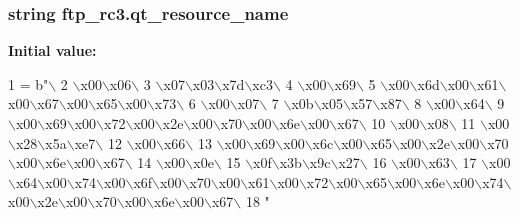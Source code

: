 \subsubsection[{qt\+\_\+resource\+\_\+name}]{\setlength{\rightskip}{0pt plus 5cm}string ftp\+\_\+rc3.\+qt\+\_\+resource\+\_\+name}\label{namespaceftp__rc3_a591b09e24ae2f06c90b5482ab500c860}
{\bfseries Initial value\+:}
\begin{DoxyCode}
1 = b\textcolor{stringliteral}{"\(\backslash\)}
2 \textcolor{stringliteral}{\(\backslash\)x00\(\backslash\)x06\(\backslash\)}
3 \textcolor{stringliteral}{\(\backslash\)x07\(\backslash\)x03\(\backslash\)x7d\(\backslash\)xc3\(\backslash\)}
4 \textcolor{stringliteral}{\(\backslash\)x00\(\backslash\)x69\(\backslash\)}
5 \textcolor{stringliteral}{\(\backslash\)x00\(\backslash\)x6d\(\backslash\)x00\(\backslash\)x61\(\backslash\)x00\(\backslash\)x67\(\backslash\)x00\(\backslash\)x65\(\backslash\)x00\(\backslash\)x73\(\backslash\)}
6 \textcolor{stringliteral}{\(\backslash\)x00\(\backslash\)x07\(\backslash\)}
7 \textcolor{stringliteral}{\(\backslash\)x0b\(\backslash\)x05\(\backslash\)x57\(\backslash\)x87\(\backslash\)}
8 \textcolor{stringliteral}{\(\backslash\)x00\(\backslash\)x64\(\backslash\)}
9 \textcolor{stringliteral}{\(\backslash\)x00\(\backslash\)x69\(\backslash\)x00\(\backslash\)x72\(\backslash\)x00\(\backslash\)x2e\(\backslash\)x00\(\backslash\)x70\(\backslash\)x00\(\backslash\)x6e\(\backslash\)x00\(\backslash\)x67\(\backslash\)}
10 \textcolor{stringliteral}{\(\backslash\)x00\(\backslash\)x08\(\backslash\)}
11 \textcolor{stringliteral}{\(\backslash\)x00\(\backslash\)x28\(\backslash\)x5a\(\backslash\)xe7\(\backslash\)}
12 \textcolor{stringliteral}{\(\backslash\)x00\(\backslash\)x66\(\backslash\)}
13 \textcolor{stringliteral}{\(\backslash\)x00\(\backslash\)x69\(\backslash\)x00\(\backslash\)x6c\(\backslash\)x00\(\backslash\)x65\(\backslash\)x00\(\backslash\)x2e\(\backslash\)x00\(\backslash\)x70\(\backslash\)x00\(\backslash\)x6e\(\backslash\)x00\(\backslash\)x67\(\backslash\)}
14 \textcolor{stringliteral}{\(\backslash\)x00\(\backslash\)x0e\(\backslash\)}
15 \textcolor{stringliteral}{\(\backslash\)x0f\(\backslash\)x3b\(\backslash\)x9c\(\backslash\)x27\(\backslash\)}
16 \textcolor{stringliteral}{\(\backslash\)x00\(\backslash\)x63\(\backslash\)}
17 \textcolor{stringliteral}{\(\backslash\)x00\(\backslash\)x64\(\backslash\)x00\(\backslash\)x74\(\backslash\)x00\(\backslash\)x6f\(\backslash\)x00\(\backslash\)x70\(\backslash\)x00\(\backslash\)x61\(\backslash\)x00\(\backslash\)x72\(\backslash\)x00\(\backslash\)x65\(\backslash\)x00\(\backslash\)x6e\(\backslash\)x00\(\backslash\)x74\(\backslash\)x00\(\backslash\)x2e\(\backslash\)x00\(\backslash\)x70\(\backslash\)x00\(\backslash\)x6e\(\backslash\)x00\(\backslash\)x67\(\backslash\)}
18 \textcolor{stringliteral}{"}
\end{DoxyCode}
\hypertarget{namespaceftp__rc3_ad8908e61ce5f0084b2cb3246d40d5143}{}
